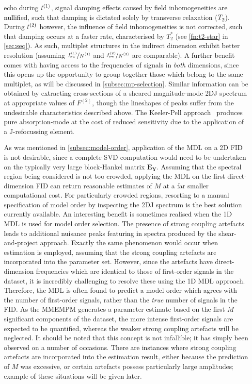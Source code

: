 echo during $t^{(1)}$, signal damping effects caused by field inhomogeneities are
nullified, such that damping is dictated solely by transverse relaxation
($T_2^{\vphantom{*}}$). During $t^{(2)}$ however, the influence of field
inhomogeneities is not
corrected, such that damping occurs at a faster rate, characterised by $T_2^*$
(see \cref{fn:t2-star} in \cref{sec:seq}).
As such, multiplet structures in the indirect dimension exhibit better
resolution (assuming $\nicefrac{\fswone}{\None}$ and
$\nicefrac{\fswtwo}{\Ntwo}$ are comparable).
A further benefit comes with having access to the frequencies of
signals in \emph{both} dimensions, since this opens up the opportunity to group
together those which belong to the same multiplet, as will be discussed in
\cref{subsec:mp-selection}.
Similar information can be obtained
by extracting cross-sections of a sheared magnitude-mode \ac{2DJ} spectrum at
appropriate values of $F^{(2)}$, though the lineshapes of peaks suffer from the
undesirable characteristics described above. The Keeler-Pell
approach~\cite{Pell2007,Foroozandeh2015} produces pure absorption-mode at the
cost of reduced sensitivity due to the application of a J-refocussing element.

As was mentioned in \cref{subsec:model-order}, application of the
\ac{MDL} on a \ac{2D} \ac{FID} is not desirable, since a complete \ac{SVD}
computation would need to be undertaken on the typically very large
block-Hankel matrix $\symbf{E}_{\symbf{Y}}$.
Assuming that the spectral region being considered is not too
crowded, applying the \ac{MDL} on the first direct-dimension \ac{FID} can
return reasonable estimates of $M$ at a far smaller computational cost. For
particularly crowded regions, resorting to a manual specification of model
order by inspecting the \ac{2DJ} spectrum is the best solution currently
available.
An interesting benefit is sometimes realised when the \ac{1D} \ac{MDL} is
used for model order selection.
The presence of strong coupling artefacts leads to
additional nuisance peaks featuring in spectra produced by the
shear-and-project approach. Exactly the
same phenomenon would occur when estimation is employed, assuming
that the strong coupling artefacts are incorporated into the parameter
set. However, since the
artefacts have direct-dimension frequencies which are identical to those of
first-order signals in the dataset, it is incredibly challenging to resolve
these using the \ac{1D} \ac{MDL} approach. Therefore, the \ac{MDL} is often
found to predict a model order which agrees with the number of first-order
signals, rather than the \emph{true} number of signals in the \ac{FID}. As the
\ac{MMEMPM} generates a parameter estimate based on the first $M$ significant
components of the dataset, the more intense first-order signals are expected to
be quantified, whereas the weaker strong coupling artefacts will be neglected.
It should be noted that this concept is not infallible; it has simply been
observed on a number of occasions. There are instances where strong coupling
artefacts are incorporated into the estimation result, either because the
prediction of $M$ was excessive, or certain artefacts possess particularly
large amplitudes; example of these situations will be given later.


